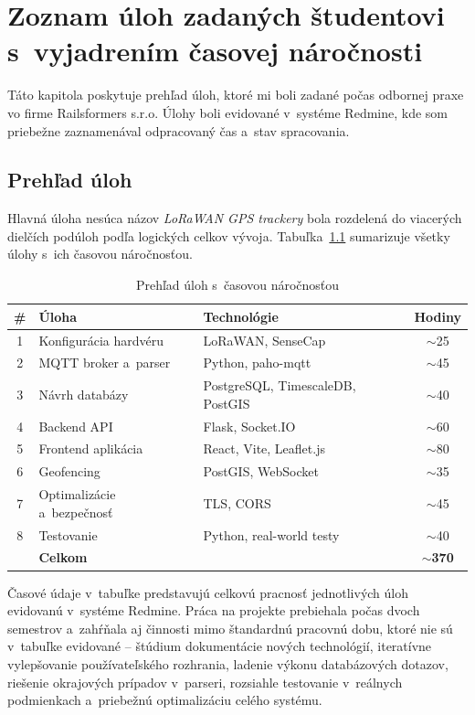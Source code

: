 \chapter{Zoznam úloh zadaných študentovi s~vyjadrením časovej náročnosti}
\label{sec:Ulohy}


Táto kapitola poskytuje prehľad úloh, ktoré mi boli zadané počas odbornej praxe vo firme Railsformers s.r.o. Úlohy boli evidované v~systéme Redmine, kde som priebežne zaznamenával odpracovaný čas a~stav spracovania.

\section{Prehľad úloh}
\label{sec:PrehledUkolu}

Hlavná úloha nesúca názov \emph{LoRaWAN GPS trackery} bola rozdelená do viacerých dielčích podúloh podľa logických celkov vývoja. Tabuľka~\ref{tab:ulohy} sumarizuje všetky úlohy s~ich časovou náročnosťou.

\begin{table}[htbp]
    \centering
    \begin{tabular}{|c|l|l|c|}
        \hline
        \textbf{\#} & \textbf{Úloha} & \textbf{Technológie} & \textbf{Hodiny} \\
        \hline
        1 & Konfigurácia hardvéru & LoRaWAN, SenseCap & $\sim$25 \\
        2 & MQTT broker a~parser & Python, paho-mqtt & $\sim$45 \\
        3 & Návrh databázy & PostgreSQL, TimescaleDB, PostGIS & $\sim$40 \\
        4 & Backend API & Flask, Socket.IO & $\sim$60 \\
        5 & Frontend aplikácia & React, Vite, Leaflet.js & $\sim$80 \\
        6 & Geofencing & PostGIS, WebSocket & $\sim$35 \\
        7 & Optimalizácie a~bezpečnosť & TLS, CORS & $\sim$45 \\
        8 & Testovanie & Python, real-world testy & $\sim$40 \\
        \hline
        & \textbf{Celkom} & & \textbf{$\sim$370} \\
        \hline
    \end{tabular}
    \caption{Prehľad úloh s~časovou náročnosťou}
    \label{tab:ulohy}
\end{table}

Časové údaje v~tabuľke predstavujú celkovú pracnosť jednotlivých úloh evidovanú v~systéme Redmine. Práca na projekte prebiehala počas dvoch semestrov a~zahŕňala aj činnosti mimo štandardnú pracovnú dobu, ktoré nie sú v~tabuľke evidované -- štúdium dokumentácie nových technológií, iteratívne vylepšovanie používateľského rozhrania, ladenie výkonu databázových dotazov, riešenie okrajových prípadov v~parseri, rozsiahle testovanie v~reálnych podmienkach a~priebežnú optimalizáciu celého systému.

